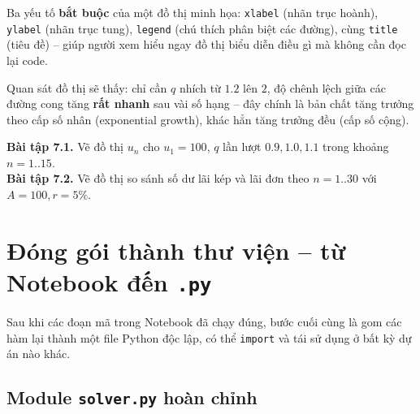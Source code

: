 \documentclass[12pt,a4paper]{report}
\begin{document}
\begin{tipbox}
Ba yếu tố \textbf{bắt buộc} của một đồ thị minh họa: \texttt{xlabel}
(nhãn trục hoành), \texttt{ylabel} (nhãn trục tung), \texttt{legend}
(chú thích phân biệt các đường), cùng \texttt{title} (tiêu đề) -- giúp
người xem hiểu ngay đồ thị biểu diễn điều gì mà không cần đọc lại code.
\end{tipbox}

\begin{infobox}
Quan sát đồ thị sẽ thấy: chỉ cần $q$ nhích từ $1.2$ lên $2$, độ chênh
lệch giữa các đường cong tăng \textbf{rất nhanh} sau vài số hạng --
đây chính là bản chất tăng trưởng theo cấp số nhân (exponential
growth), khác hẳn tăng trưởng đều (cấp số cộng).
\end{infobox}

\begin{exbox}
\textbf{Bài tập 7.1.} Vẽ đồ thị $u_n$ cho $u_1 = 100$, $q$ lần lượt
$0.9, 1.0, 1.1$ trong khoảng $n = 1..15$.\\[2pt]
\textbf{Bài tập 7.2.} Vẽ đồ thị so sánh số dư lãi kép và lãi đơn theo
$n = 1..30$ với $A = 100, r = 5\%$.
\end{exbox}

\newpage

\chapter{Đóng gói thành thư viện -- từ Notebook đến \texttt{.py}}

Sau khi các đoạn mã trong Notebook đã chạy đúng, bước cuối cùng là gom
các hàm lại thành một file Python độc lập, có thể \texttt{import} và tái
sử dụng ở bất kỳ dự án nào khác.

\section{Module \texttt{solver.py} hoàn chỉnh}
\end{document}
